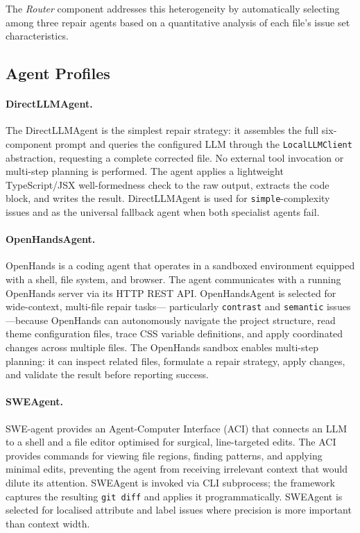 The \emph{Router} component addresses this heterogeneity by automatically
selecting among three repair agents based on a quantitative analysis of each
file's issue set characteristics.

\subsection{Agent Profiles}

\paragraph{DirectLLMAgent.}
The DirectLLMAgent is the simplest repair strategy: it assembles the full
six-component prompt and queries the configured LLM through the
\texttt{LocalLLMClient} abstraction, requesting a complete corrected file.
No external tool invocation or multi-step planning is performed.  The agent
applies a lightweight TypeScript/JSX well-formedness check to the raw output,
extracts the code block, and writes the result.  DirectLLMAgent is used for
\texttt{simple}-complexity issues and as the universal fallback agent when
both specialist agents fail.

\paragraph{OpenHandsAgent.}
OpenHands \cite{openhands2024} is a coding agent that operates in a sandboxed
environment equipped with a shell, file system, and browser.  The agent
communicates with a running OpenHands server via its HTTP REST API.
OpenHandsAgent is selected for wide-context, multi-file repair tasks—
particularly \texttt{contrast} and \texttt{semantic} issues—because OpenHands
can autonomously navigate the project structure, read theme configuration files,
trace CSS variable definitions, and apply coordinated changes across multiple
files.  The OpenHands sandbox enables multi-step planning: it can inspect
related files, formulate a repair strategy, apply changes, and validate the
result before reporting success.

\paragraph{SWEAgent.}
SWE-agent \cite{sweagent} provides an Agent-Computer Interface (ACI) that
connects an LLM to a shell and a file editor optimised for surgical,
line-targeted edits.  The ACI provides commands for viewing file regions,
finding patterns, and applying minimal edits, preventing the agent from
receiving irrelevant context that would dilute its attention.  SWEAgent is
invoked via CLI subprocess; the framework captures the resulting \texttt{git
diff} and applies it programmatically.  SWEAgent is selected for localised
attribute and label issues where precision is more important than context width.


